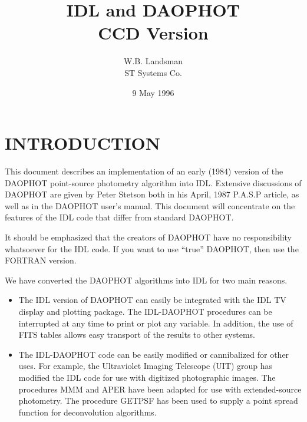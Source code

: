 \topmargin -0.2in
\oddsidemargin-0.15in
\evensidemargin-0.25in
\textheight 8.5in     
\textwidth 6.5in
\newcommand{\exbegin}{\par\medskip}
\newcommand{\exend}{\medskip\noindent}
\newcommand{\exc}[2]{
\hbox to \hsize{\small\hskip .2in
\parbox[t]{2.2in}{\raggedright\setlength{\parindent}{-.2in}\tt #1}
\hspace{.2in}
\parbox[t]{3.4in}{\raggedright\setlength{\parindent}{-.2in}\rm #2}\hss}
\prevdepth=1.5pt\relax}
\newcommand{\exone}[1]{\begin{center}\tt #1 \end{center}}

\title{IDL and DAOPHOT \\ CCD Version }
\author{W.B. Landsman \\ ST Systems Co.}
\date{9 May 1996}
\maketitle
\section{INTRODUCTION}
This document describes an implementation of an early (1984) version of
the DAOPHOT point-source
photometry algorithm into IDL.  Extensive discussions of DAOPHOT are given   
by Peter Stetson both in his April, 1987 P.A.S.P article, as well as in 
the DAOPHOT user's
manual.
This document will
concentrate on the features of the IDL code that differ from standard
DAOPHOT.   

It should be emphasized that the creators of DAOPHOT have no responsibility
whatsoever for the IDL code.  If you want to use ``true'' DAOPHOT, then use
the FORTRAN version.

We have converted the DAOPHOT algorithms into IDL for two main reasons.
\begin{itemize}
\item The IDL version of DAOPHOT can easily be integrated with the IDL 
TV display and plotting package.  The IDL-DAOPHOT procedures can be 
interrupted at any time to print or plot any variable.
In addition, the use of FITS tables allows 
easy transport of the results to other systems. 

\item The IDL-DAOPHOT code can be easily modified or cannibalized 
for other uses.  For example, the Ultraviolet Imaging Telescope (UIT) group 
has modified the IDL code for use with digitized photographic images. 
The procedures MMM and APER have been adapted for use with extended-source 
photometry.  The procedure GETPSF has been used to supply a point
spread function for deconvolution algorithms.    
\end{itemize}

